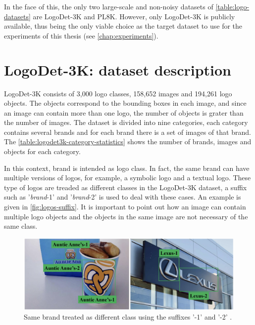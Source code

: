 In the face of this, the only two large-scale and non-noisy datasets of \autoref{table:logo-datasets} are LogoDet-3K and PL8K. However, only LogoDet-3K is publicly available, thus being the only viable choice as the target dataset to use for the experiments of this thesis (see \autoref{chap:experiments}).


\section{LogoDet-3K: dataset description}
\label{sec:logodet-desc}
LogoDet-3K consists of 3,000 logo classes,
158,652 images and 194,261 logo objects. The objects correspond to the bounding boxes in each image, and since an image can contain more than one logo, the number of objects is grater than the number of images. 
The dataset is divided into nine categories, each category contains several brands and for each brand there is a set of images of that brand. The \autoref{table:logodet3k-category-statistics} shows the number of brands, images and objects for each category.

In this context, brand is intended as logo class. In fact, the same brand can have multiple versions of logos, for example, a symbolic logo and a textual logo. These type of logos are treaded as different classes in the LogoDet-3K dataset, a suffix such as '\textit{brand}-1' and '\textit{brand}-2' is used to deal with these cases. An example is given in \autoref{fig:logos-suffix}.
It is important to point out how an image can contain multiple logo objects and the objects in the same image are not necessary of the same class.


\begin{figure}%
	\centering

    \begin{center}
        \includegraphics[width=\columnwidth]{images/logos-suffix.png}
    \end{center}
	\caption{Same brand treated as different class using the suffixes '-1' and '-2' \cite{wang2022logodet}.}%
	\label{fig:logos-suffix}%
\end{figure}

